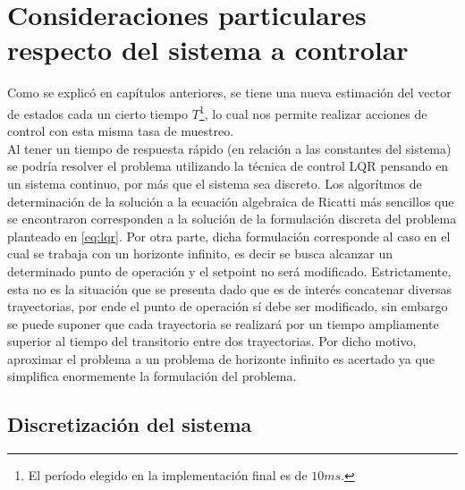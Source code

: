 \documentclass[main]{subfiles}
\begin{document}
\section{Consideraciones particulares respecto del sistema a controlar}

Como se explic\'o en cap\'itulos anteriores, se tiene una nueva estimaci\'on del vector de estados cada un cierto tiempo $T$\footnote{El per\'iodo elegido en la implementaci\'on final es de $10ms$.}, lo cual nos permite realizar acciones de control con esta misma tasa de muestreo. \\

Al tener un tiempo de respuesta r\'apido (en relaci\'on a las constantes del sistema) se podr\'ia resolver el problema utilizando la t\'ecnica de control LQR pensando en un sistema continuo, por m\'as que el sistema sea discreto. Los algor\'itmos de determinaci\'on de la soluci\'on a la ecuaci\'on algebraica de Ricatti m\'as sencillos que se encontraron corresponden a la soluci\'on de la formulaci\'on discreta del problema planteado en \ref{eq:lqr}. Por otra parte, dicha formulaci\'on corresponde al caso en el cual se trabaja con un horizonte infinito, es decir se busca alcanzar un determinado punto de operaci\'on y el setpoint no ser\'a modificado. Estrictamente, esta no es la situaci\'on que se presenta dado que es de inter\'es concatenar diversas trayectorias, por ende el punto de operaci\'on s\'i debe ser modificado, sin embargo se puede suponer que cada trayectoria se realizar\'a por un tiempo ampliamente superior al tiempo del transitorio entre dos trayectorias. Por dicho motivo, aproximar el problema a un problema de horizonte infinito es acertado ya que simplifica enormemente la formulaci\'on del problema.

\subsection{Discretizaci\'on del sistema}
\end{document}
